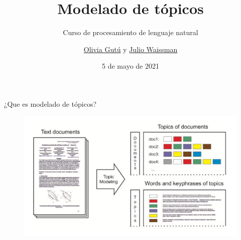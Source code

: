 \documentclass[presentation, t]{beamer}
\author[O. Gutú y J. Waissman]{\href{mailto:olivia.gutu@unison.mx}{Olivia Gutú} y \href{mailto:julio.waissman@unison.mx}{Julio Waissman}}
\date{5 de mayo de 2021}
\title{Modelado de tópicos}
\subtitle{Curso de procesamiento de lenguaje natural}
\institute[MCD]{Maestría en Ciencia de Datos\\ Universidad de Sonora}
\begin{document}
\maketitle


\begin{frame}{¿Que es modelado de tópicos?}
\begin{figure}[htbp]
\centering
\includegraphics[width=\textwidth]{./imagenes/topic.png}
\end{figure}
\end{frame}

\end{document}
